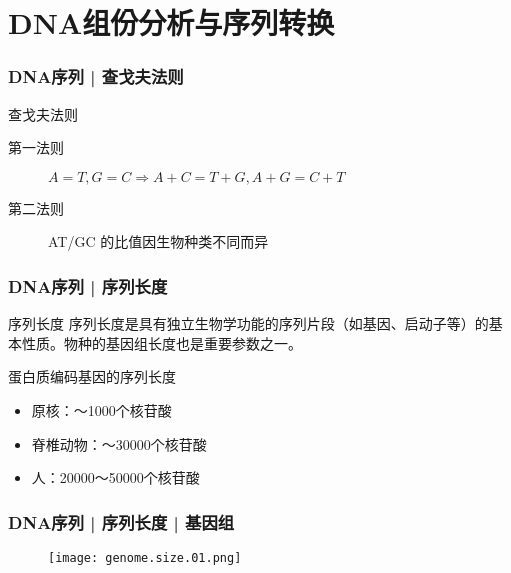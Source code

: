 \section{DNA组份分析与序列转换}
\begin{frame}
  \frametitle{DNA序列 | 查戈夫法则}
  \begin{block}{查戈夫法则}
    \begin{description}
      \item[第一法则]$A=T, G=C \Longrightarrow A+C=T+G, A+G=C+T$
      \item[第二法则]AT/GC 的比值因生物种类不同而异
    \end{description}
  \end{block}
\end{frame}

\begin{frame}
  \frametitle{DNA序列 | 序列长度}
  \begin{block}{序列长度}
    序列长度是具有独立生物学功能的序列片段（如基因、启动子等）的基本性质。物种的基因组长度也是重要参数之一。 
  \end{block}
  \pause
  \begin{block}{蛋白质编码基因的序列长度}
    \begin{itemize}
      \item 原核：～1000个核苷酸
      \item 脊椎动物：～30000个核苷酸
      \item 人：20000～50000个核苷酸
    \end{itemize}
  \end{block}
\end{frame}

\begin{frame}
  \frametitle{DNA序列 | 序列长度 | 基因组}
  \begin{figure}
    \centering
    \texttt{[image: genome.size.01.png]}
  \end{figure}
\end{frame}


